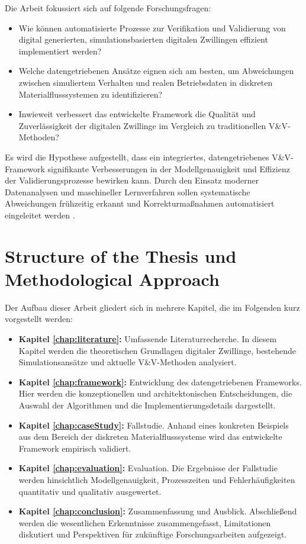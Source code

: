 Die Arbeit fokussiert sich auf folgende Forschungsfragen:
\begin{itemize}
  \item Wie können automatisierte Prozesse zur Verifikation und Validierung von digital generierten, simulationsbasierten digitalen Zwillingen effizient implementiert werden?
  \item Welche datengetriebenen Ansätze eignen sich am besten, um Abweichungen zwischen simuliertem Verhalten und realen Betriebsdaten in diskreten Materialflusssystemen zu identifizieren?
  \item Inwieweit verbessert das entwickelte Framework die Qualität und Zuverlässigkeit der digitalen Zwillinge im Vergleich zu traditionellen V\&V-Methoden?
\end{itemize}

Es wird die Hypothese aufgestellt, dass ein integriertes, datengetriebenes V\&V-Framework signifikante Verbesserungen in der Modellgenauigkeit und Effizienz der Validierungsprozesse bewirken kann. Durch den Einsatz moderner Datenanalysen und maschineller Lernverfahren sollen systematische Abweichungen frühzeitig erkannt und Korrekturmaßnahmen automatisiert eingeleitet werden \parencite{Tao2018}.

\section{Structure of the Thesis und Methodological Approach}

Der Aufbau dieser Arbeit gliedert sich in mehrere Kapitel, die im Folgenden kurz vorgestellt werden:

\begin{itemize}
  \item \textbf{Kapitel \ref{chap:literature}:} Umfassende Literaturrecherche. In diesem Kapitel werden die theoretischen Grundlagen digitaler Zwillinge, bestehende Simulationsansätze und aktuelle V\&V-Methoden analysiert.
  \item \textbf{Kapitel \ref{chap:framework}:} Entwicklung des datengetriebenen Frameworks. Hier werden die konzeptionellen und architektonischen Entscheidungen, die Auswahl der Algorithmen und die Implementierungsdetails dargestellt.
  \item \textbf{Kapitel \ref{chap:caseStudy}:} Fallstudie. Anhand eines konkreten Beispiels aus dem Bereich der diskreten Materialflusssysteme wird das entwickelte Framework empirisch validiert.
  \item \textbf{Kapitel \ref{chap:evaluation}:} Evaluation. Die Ergebnisse der Fallstudie werden hinsichtlich Modellgenauigkeit, Prozesszeiten und Fehlerhäufigkeiten quantitativ und qualitativ ausgewertet.
  \item \textbf{Kapitel \ref{chap:conclusion}:} Zusammenfassung und Ausblick. Abschließend werden die wesentlichen Erkenntnisse zusammengefasst, Limitationen diskutiert und Perspektiven für zukünftige Forschungsarbeiten aufgezeigt.
\end{itemize}

